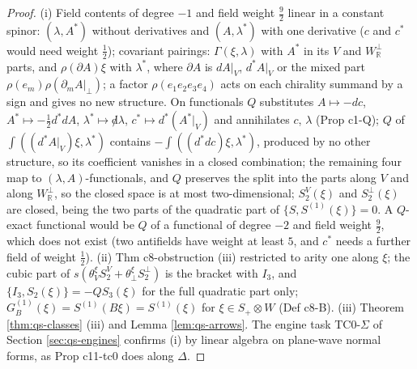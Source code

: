 \begin{proof}
(i) Field contents of degree $-1$ and field weight $\tfrac92$ linear in a constant spinor: $(\lambda,A^*)$ without derivatives and $(A,\lambda^*)$ with one derivative ($c$ and $c^*$ would need weight $\tfrac12$); covariant pairings: $\Gamma(\xi,\lambda)$ with $A^*$ in its $V$ and $W^\perp_{\mathbb R}$ parts, and $\rho(\partial A)\xi$ with $\lambda^*$, where $\partial A$ is $dA|_V$, $d^*A|_V$ or the mixed part $\rho(e_m)\rho(\partial_mA|_\perp)$; a factor $\rho(e_1e_2e_3e_4)$ acts on each chirality summand by a sign and gives no new structure. On functionals $Q$ substitutes $A\mapsto-dc$, $A^*\mapsto-\tfrac12d^*dA$, $\lambda^*\mapsto{\not d}\lambda$, $c^*\mapsto d^*(A^*|_V)$ and annihilates $c$, $\lambda$ (Prop c1-Q); $Q$ of $\int((d^*A|_V)\xi,\lambda^*)$ contains $-\int((d^*dc)\xi,\lambda^*)$, produced by no other structure, so its coefficient vanishes in a closed combination; the remaining four map to $(\lambda,A)$-functionals, and $Q$ preserves the split into the parts along $V$ and along $W^\perp_{\mathbb R}$, so the closed space is at most two-dimensional; $S^V_2(\xi)$ and $S^\perp_2(\xi)$ are closed, being the two parts of the quadratic part of $\{S,S^{(1)}(\xi)\}=0$. A $Q$-exact functional would be $Q$ of a functional of degree $-2$ and field weight $\tfrac92$, which does not exist (two antifields have weight at least $5$, and $c^*$ needs a further field of weight $\tfrac12$). (ii) Thm c8-obstruction (iii) restricted to arity one along $\xi$; the cubic part of $s(\theta^\xi_VS^V_2+\theta^\xi_\perp S^\perp_2)$ is the bracket with $I_3$, and $\{I_3,S_2(\xi)\}=-QS_3(\xi)$ for the full quadratic part only; $G_B^{(1)}(\xi)=S^{(1)}(B\xi)=S^{(1)}(\xi)$ for $\xi\in S_+\otimes W$ (Def c8-B). (iii) Theorem \ref{thm:qs-classes} (iii) and Lemma \ref{lem:qs-arrows}. The engine task TC0-$\Sigma$ of Section \ref{sec:qs-engines} confirms (i) by linear algebra on plane-wave normal forms, as Prop c11-tc0 does along $\Delta$.
\end{proof}

